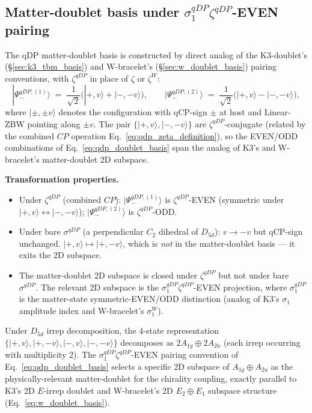 \documentclass[11pt,letterpaper]{article}
\begin{document}
\subsection{Matter-doublet basis under $\sigma_1^{qDP}\zeta^{qDP}$-EVEN pairing}\label{sec:qdp_doublet_basis}

The qDP matter-doublet basis is constructed by direct analog of the K3-doublet's (\S\ref{sec:k3_tbm_basis}) and W-bracelet's (\S\ref{sec:w_doublet_basis}) pairing conventions, with $\zeta^{qDP}$ in place of $\zeta$ or $\zeta^W$:
\begin{equation}\label{eq:qdp_doublet_basis}
|\Psi_-^{qDP,(1)}\rangle \;=\; \frac{1}{\sqrt{2}}\bigl(|+, v\rangle + |-, -v\rangle\bigr), \qquad
|\Psi_-^{qDP,(2)}\rangle \;=\; \frac{1}{\sqrt{2}}\bigl(|+, v\rangle - |-, -v\rangle\bigr),
\end{equation}
where $|\pm, \pm v\rangle$ denotes the configuration with qCP-sign $\pm$ at host and Linear-ZBW pointing along $\pm v$. The pair $\{|+, v\rangle, |-, -v\rangle\}$ are $\zeta^{qDP}$-conjugate (related by the combined $CP$ operation Eq.~\eqref{eq:qdp_zeta_definition}), so the EVEN/ODD combinations of Eq.~\eqref{eq:qdp_doublet_basis} span the analog of K3's and W-bracelet's matter-doublet 2D subspace.

\textbf{Transformation properties.}
\begin{itemize}\setlength\itemsep{0.2em}
    \item Under $\zeta^{qDP}$ (combined $CP$): $|\Psi_-^{qDP,(1)}\rangle$ is $\zeta^{qDP}$-EVEN (symmetric under $|+, v\rangle \leftrightarrow |-, -v\rangle$); $|\Psi_-^{qDP,(2)}\rangle$ is $\zeta^{qDP}$-ODD.
    \item Under bare $\sigma^{qDP}$ (a perpendicular $C_2$ dihedral of $D_{5d}$): $v \to -v$ but qCP-sign unchanged. $|+, v\rangle \mapsto |+, -v\rangle$, which is \emph{not} in the matter-doublet basis --- it exits the 2D subspace.
    \item The matter-doublet 2D subspace is closed under $\zeta^{qDP}$ but not under bare $\sigma^{qDP}$. The relevant 2D subspace is the $\sigma_1^{qDP} \zeta^{qDP}$-EVEN projection, where $\sigma_1^{qDP}$ is the matter-state symmetric-EVEN/ODD distinction (analog of K3's $\sigma_1$ amplitude index and W-bracelet's $\sigma_1^W$).
\end{itemize}

Under $D_{5d}$ irrep decomposition, the 4-state representation $\{|+, v\rangle, |+, -v\rangle, |-, v\rangle, |-, -v\rangle\}$ decomposes as $2 A_{1g} \oplus 2 A_{2u}$ (each irrep occurring with multiplicity 2). The $\sigma_1^{qDP}\zeta^{qDP}$-EVEN pairing convention of Eq.~\eqref{eq:qdp_doublet_basis} selects a specific 2D subspace of $A_{1g} \oplus A_{2u}$ as the physically-relevant matter-doublet for the chirality coupling, exactly parallel to K3's 2D $E$-irrep doublet and W-bracelet's 2D $E_2 \oplus E_1$ subspace structure (Eq.~\eqref{eq:w_doublet_basis}).
\end{document}
